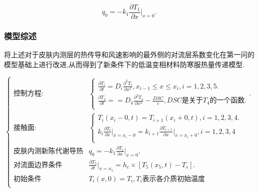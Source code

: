 \documentclass{whutmod}
\begin{document}
\begin{equation}
q_0=-k_{1}\frac{\partial T_{1}}{\partial x}\big|_{x=0}.
\end{equation}

\subsubsection{模型综述}
将上述对于皮肤内测层的热传导和风速影响的最外侧的对流层系数变化在第一问的模型基础上进行改进,从而得到了新条件下的低温变相材料防寒服热量传递模型.

\begin{equation}
\begin{cases}
\text{控制方程:}&\begin{cases}\frac{\partial T_{i}}{\partial t}=D_{i}\frac{\partial^{2}T_{i}}{\partial x^{2}},x_{i-1}\leq x \le x_{i},i=1,2,3,5.\\
\frac{\partial T_{4}}{\partial t}==D_{4}\frac{\partial^{2}T_{4}}{\partial x^{2}}-\frac{DSC}{c},\text{$DSC$是关于$T_{4}$的一个函数}.\\
\end{cases}.\\
\text{接触面:}&\begin{cases}T_{i}(x_{i}-0,t)=T_{i+1}(x_{i}+0,t),i=1,2,3,4.\\
k_{i} \frac{\partial T_{i}}{\partial x}\big|_{x=x_{i}-0}=k_{i+1} \frac{\partial T_{i+1}}{\partial x}\big|_{x=x_{i}+0},i=1,2,3,4\\
\end{cases}\\
\text{皮肤内测新陈代谢导热}&q_0=-k_{1}\frac{\partial T_{1}}{\partial x}\big|_{x=0}.\\
\text{对流面边界条件}&\frac{\partial T_{5}}{\partial{t}}\big|_{x=x_{5}}=h_{c}\times[T_{5}(x_{5},t)-T_{s}].\\

\text{初始条件}& T_{i}(x,0)=T_{i},T_{i}\text{表示各介质初始温度}\\
\end{cases}
\end{equation}
\end{document}
